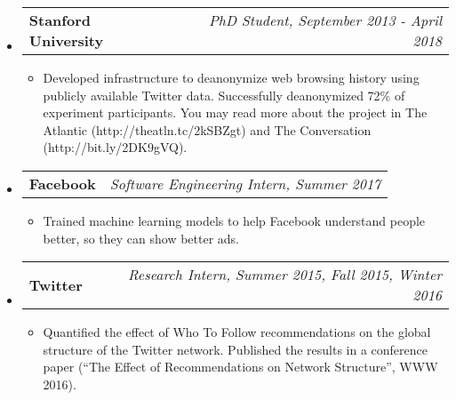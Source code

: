 \documentclass[letterpaper,10pt]{article}
\makeatletter
\newcommand{\ressubheading}[4]{
\begin{tabular*}{7.0in}{l@{\extracolsep{\fill}}r}
		\textbf{#1} & \textit{#4} \\
\end{tabular*}\vspace{-6pt}}
\makeatother
\begin{document}
\begin{itemize}
\item
	\ressubheading{Stanford University}{Stanford, CA}{PhD Student}{PhD Student, September 2013 - April 2018}
	\begin{itemize}
	\item Developed infrastructure to deanonymize web browsing history using publicly available Twitter data.  Successfully deanonymized 72\% of experiment participants.  You may read more about the project in The Atlantic (http://theatln.tc/2kSBZgt) and The Conversation (http://bit.ly/2DK9gVQ).
	\end{itemize}
\item
	\ressubheading{Facebook}{Seattle, WA}{Software Engineering Intern}{Software Engineering Intern, Summer 2017}
	\begin{itemize}
	\item Trained machine learning models to help Facebook understand people better, so they can show better ads.
	\end{itemize}
\item
	\ressubheading{Twitter}{San Francisco, CA}{Research Intern}{Research Intern, Summer 2015, Fall 2015, Winter 2016}
	\begin{itemize}
\item Quantified the effect of Who To Follow recommendations on the global structure of the Twitter network.  Published the results in a conference paper (``The Effect of Recommendations on Network Structure'', WWW 2016).


\end{itemize}
\end{itemize}
\end{document}
